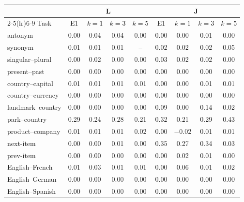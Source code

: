 \begin{tabular}{@{}lcccccccc@{}}
\toprule
 & \multicolumn{4}{c}{L} & \multicolumn{4}{c}{J} \\
\cmidrule(lr){2-5}\cmidrule(lr){6-9}
Task & E1 & $k=1$ & $k=3$ & $k=5$ & E1 & $k=1$ & $k=3$ & $k=5$ \\
\midrule
antonym & 0.00 & 0.04 & 0.04 & 0.00 & 0.00 & 0.00 & 0.01 & 0.00 \\
synonym & 0.01 & 0.01 & 0.01 & -- & 0.02 & 0.02 & 0.02 & 0.05 \\
singular--plural & 0.00 & 0.02 & 0.00 & 0.00 & 0.03 & 0.02 & 0.02 & 0.00 \\
present--past & 0.00 & 0.00 & 0.00 & 0.00 & 0.00 & 0.00 & 0.00 & 0.00 \\
country--capital & 0.01 & 0.01 & 0.01 & 0.01 & 0.00 & 0.00 & 0.01 & 0.01 \\
country--currency & 0.00 & 0.00 & 0.00 & 0.00 & 0.00 & 0.00 & 0.00 & 0.00 \\
landmark--country & 0.00 & 0.00 & 0.00 & 0.00 & 0.09 & 0.00 & 0.14 & 0.02 \\
park--country & 0.29 & 0.24 & 0.28 & 0.21 & 0.32 & 0.21 & 0.29 & 0.43 \\
product--company & 0.01 & 0.01 & 0.01 & 0.02 & 0.00 & $-$0.02 & 0.01 & 0.01 \\
next-item & 0.00 & 0.00 & 0.01 & 0.00 & 0.35 & 0.27 & 0.34 & 0.03 \\
prev-item & 0.00 & 0.00 & 0.00 & 0.00 & 0.00 & 0.02 & 0.01 & 0.00 \\
English--French & 0.01 & 0.03 & 0.01 & 0.01 & 0.00 & 0.06 & 0.01 & 0.02 \\
English--German & 0.00 & 0.00 & 0.00 & 0.00 & 0.00 & 0.00 & 0.00 & 0.00 \\
English--Spanish & 0.00 & 0.00 & 0.00 & 0.00 & 0.00 & 0.00 & 0.00 & 0.00 \\
\bottomrule
\end{tabular}
